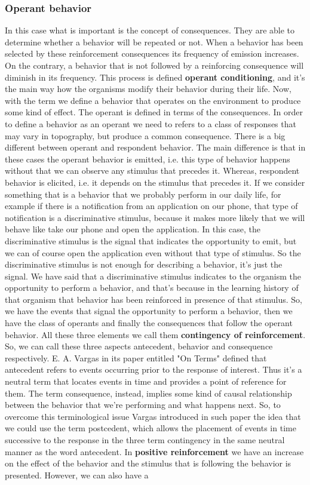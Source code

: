 \documentclass[11pt]{article}
\begin{document}
\subsubsection{Operant behavior}
In this case what is important is the concept of consequences. They are able to determine whether a behavior will be repeated or not. When a behavior has been selected by these reinforcement consequences its frequency of emission increases. On the contrary, a behavior that is not followed by a reinforcing consequence will diminish in its frequency. This process is defined \textbf{operant conditioning}, and it's the main way how the organisms modify their behavior during their life. Now, with the term we define a behavior that operates on the environment to produce some kind of effect. The operant is defined in terms of the consequences. In order to define a behavior as an operant we need to refers to a class of responses that may vary in topography, but produce a common consequence. There is a big different between operant and respondent behavior. The main difference is that in these cases the operant behavior is emitted, i.e. this type of behavior happens without that we can observe any stimulus that precedes it. Whereas, respondent behavior is elicited, i.e. it depends on the stimulus that precedes it. If we consider something that is a behavior that we probably perform in our daily life, for example if there is a notification from an application on our phone, that type of notification is a discriminative stimulus, because it makes more likely that we will behave like take our phone and open the application. In this case, the discriminative stimulus is the signal that indicates the opportunity to emit, but we can of course open the application even without that type of stimulus. So the discriminative stimulus is not enough for describing a behavior, it's just the signal. We have said that a discriminative stimulus indicates to the organism the opportunity to perform a behavior, and that's because in the learning history of that organism that behavior has been reinforced in presence of that stimulus. So, we have the events that signal the opportunity to perform a behavior, then we have the class of operants and finally the consequences that follow the operant behavior. All these three elements we call them \textbf{contingency of reinforcement}. So, we can call these three aspects antecedent, behavior and consequence respectively. E. A. Vargas in its paper entitled "On Terms" defined that antecedent refers to events occurring prior to the response of interest. Thus it's a neutral term that locates events in time and provides a point of reference for them. The term consequence, instead, implies some kind of causal relationship between the behavior that we're performing and what happens next. So, to overcome this terminological issue Vargas introduced in such paper the idea that we could use the term postcedent, which allows the placement of events in time successive to the response in the three term contingency in the same neutral manner as the word antecedent. In \textbf{positive reinforcement} we have an increase on the effect of the behavior and the stimulus that is following the behavior is presented. However, we can also have a 
\end{document}

